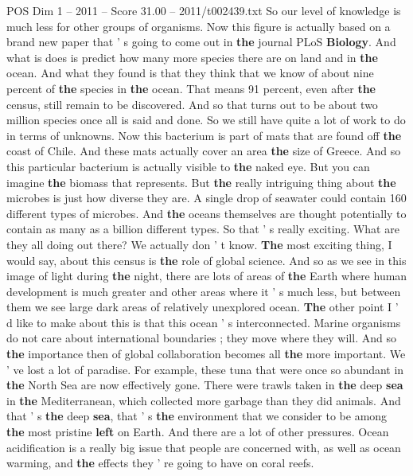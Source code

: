 \begin{textsample}{POS Dim 1 – 2011 – Score 31.00 – 2011/t002439.txt}
So our level of knowledge is much less for other groups of organisms.
Now this figure is actually based on a brand new paper that ' s going to come out in \textbf{the} journal PLoS \textbf{Biology}.
And what is does is predict how many more species there are on land and in \textbf{the} ocean.
And what they found is that they think that we know of about nine percent of \textbf{the} species in \textbf{the} ocean.
That means 91 percent, even after \textbf{the} census, still remain to be discovered.
And so that turns out to be about two million species once all is said and done.
So we still have quite a lot of work to do in terms of unknowns.
Now this bacterium is part of mats that are found off \textbf{the} coast of Chile.
And these mats actually cover an area \textbf{the} size of Greece.
And so this particular bacterium is actually visible to \textbf{the} naked eye.
But you can imagine \textbf{the} biomass that represents.
But \textbf{the} really intriguing thing about \textbf{the} microbes is just how diverse they are.
A single drop of seawater could contain 160 different types of microbes.
And \textbf{the} oceans themselves are thought potentially to contain as many as a billion different types.
So that ' s really exciting.
What are they all doing out there?
We actually don ' t know. \textbf{The} most exciting thing, I would say, about this census is \textbf{the} role of global science.
And so as we see in this image of light during \textbf{the} night, there are lots of areas of \textbf{the} Earth where human development is much greater and other areas where it ' s much less, but between them we see large dark areas of relatively unexplored ocean. \textbf{The} other point I ' d like to make about this is that this ocean ' s interconnected.
Marine organisms do not care about international boundaries ; they move where they will.
And so \textbf{the} importance then of global collaboration becomes all \textbf{the} more important.
We ' ve lost a lot of paradise.
For example, these tuna that were once so abundant in \textbf{the} North Sea are now effectively gone.
There were trawls taken in \textbf{the} deep \textbf{sea} in \textbf{the} Mediterranean, which collected more garbage than they did animals.
And that ' s \textbf{the} deep \textbf{sea}, that ' s \textbf{the} environment that we consider to be among \textbf{the} most pristine \textbf{left} on Earth.
And there are a lot of other pressures.
Ocean acidification is a really big issue that people are concerned with, as well as ocean warming, and \textbf{the} effects they ' re going to have on coral reefs.

\end{textsample}
